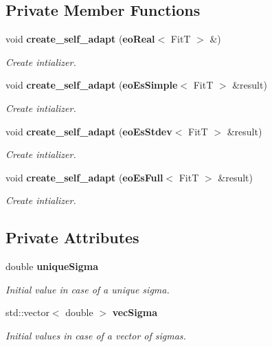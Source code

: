 \subsection*{Private Member Functions}
\begin{CompactItemize}
\item 
void {\bf create\_\-self\_\-adapt} ({\bf eo\-Real}$<$ Fit\-T $>$ \&)
\begin{CompactList}\small\item\em Create intializer. \item\end{CompactList}\item 
void {\bf create\_\-self\_\-adapt} ({\bf eo\-Es\-Simple}$<$ Fit\-T $>$ \&result)
\begin{CompactList}\small\item\em Create intializer. \item\end{CompactList}\item 
void {\bf create\_\-self\_\-adapt} ({\bf eo\-Es\-Stdev}$<$ Fit\-T $>$ \&result)
\begin{CompactList}\small\item\em Create intializer. \item\end{CompactList}\item 
void {\bf create\_\-self\_\-adapt} ({\bf eo\-Es\-Full}$<$ Fit\-T $>$ \&result)
\begin{CompactList}\small\item\em Create intializer. \item\end{CompactList}\end{CompactItemize}
\subsection*{Private Attributes}
\begin{CompactItemize}
\item 
double {\bf unique\-Sigma}\label{classeo_es_chrom_init_r0}

\begin{CompactList}\small\item\em Initial value in case of a unique sigma. \item\end{CompactList}\item 
std::vector$<$ double $>$ {\bf vec\-Sigma}\label{classeo_es_chrom_init_r1}

\begin{CompactList}\small\item\em Initial values in case of a vector of sigmas. \item\end{CompactList}\end{CompactItemize}


